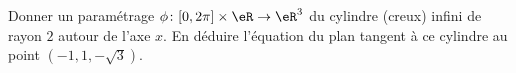 
\begin{exercice}\label{exoOutilsMath-0114}

    Donner un paramétrage $\phi\colon \mathopen[ 0 , 2\pi \mathclose]\times \eR\to \eR^3$ du cylindre (creux) infini de rayon $2$ autour de l'axe $x$. En déduire l'équation du plan tangent à ce cylindre au point $(-1,1,-\sqrt{3})$.

\end{exercice}

